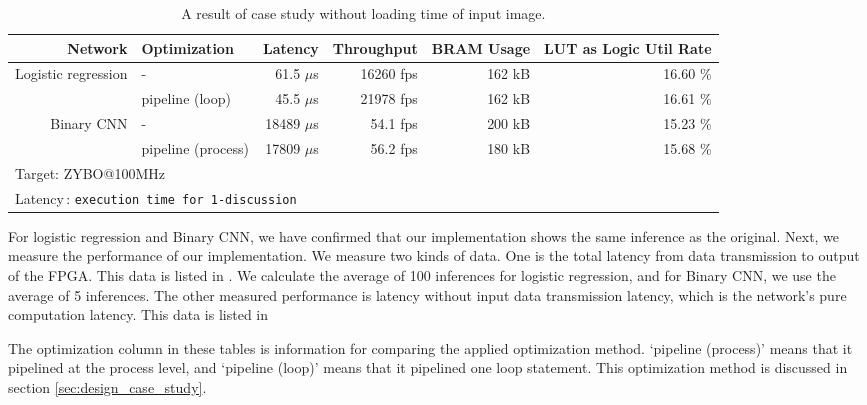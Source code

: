 \begin{table}[tbp]
\caption{A result of case study without loading time of input image.}
\label{tab:result2}
  \begin{adjustwidth}{-2in}{-2in}
    \centering
    \begin{tabular}{rl|rrrr}
      \hline\hline
                   Network & Optimization & Latency & Throughput & BRAM Usage & LUT as Logic Util Rate \\
      \hline
      \multirow{2}{*}{
      Logistic regression} & -                &  61.5 $\mu$s & 16260 fps & 162 kB & 16.60 \% \\
                           & pipeline (loop) &  45.5 $\mu$s & 21978 fps & 162 kB & 16.61 \% \\
      \multirow{2}{*}{
      Binary CNN}          & -                & 18489 $\mu$s &  54.1 fps & 200 kB & 15.23 \% \\
                           & pipeline (process) & 17809 $\mu$s &  56.2 fps & 180 kB & 15.68 \% \\
      \hline
      \multicolumn{6}{l}{Target: ZYBO@100MHz}\\
      \multicolumn{6}{l}{Latency\,: {\tt execution time for 1-discussion}}\\
    \end{tabular}
  \end{adjustwidth}
\end{table}


For logistic regression and Binary CNN, we have confirmed that our implementation shows the same inference as the original. Next, we measure the performance of our implementation. We measure two kinds of data. One is the total latency from data transmission to output of the FPGA. This data is listed in . We calculate the average of 100 inferences for logistic regression, and for Binary CNN, we use the average of 5 inferences. The other measured performance is latency without input data transmission latency, which is the network's pure computation latency. This data is listed in 

The optimization column in these tables is information for comparing the applied optimization method. `pipeline (process)' means that it pipelined at the process level, and `pipeline (loop)' means that it pipelined one loop statement. This optimization method is discussed in section \ref{sec:design_case_study}.

